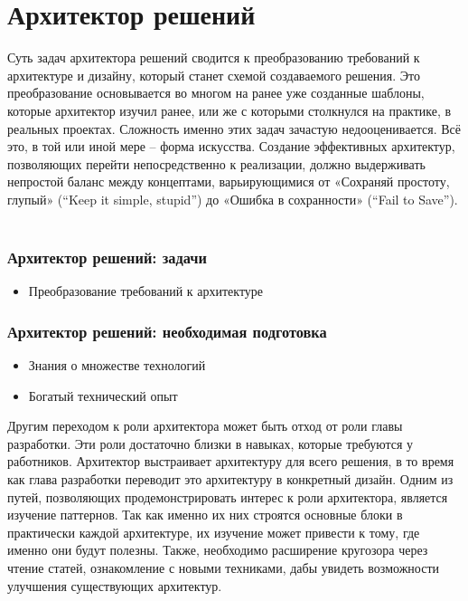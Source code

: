 \documentclass{../industrial-development}
\begin{document}
\section{Архитектор решений }

\lecturenotes

Суть задач архитектора решений сводится к преобразованию требований к архитектуре и дизайну, который станет схемой создаваемого решения. Это преобразование основывается во многом на ранее уже созданные шаблоны, которые архитектор изучил ранее, или же с которыми столкнулся на практике, в реальных проектах. 
Сложность именно этих задач зачастую недооценивается. Всё это, в той или иной мере – форма искусства. Создание эффективных архитектур, позволяющих перейти непосредственно к реализации, должно выдерживать непростой баланс между концептами, варьирующимися от «Сохраняй простоту, глупый» (“Keep it simple, stupid”) до «Ошибка в сохранности» (“Fail to Save”).
   ~\cite{Anatomy}

\begin{frame} \frametitle{Архитектор решений: задачи}
  \begin{itemize}
	\item Преобразование требований к архитектуре
	\end{itemize}
\end{frame}

\lecturenotes

\begin{frame} \frametitle{Архитектор решений: необходимая подготовка}
  \begin{itemize}
	\item Знания о множестве технологий
	\item Богатый технический опыт
	\end{itemize}
\end{frame}

\lecturenotes
Другим переходом к роли архитектора может быть отход от роли главы разработки. Эти роли достаточно близки в навыках, которые требуются у работников. Архитектор выстраивает архитектуру для всего решения, в то время как глава разработки переводит это архитектуру в конкретный дизайн. 
Одним из путей, позволяющих продемонстрировать интерес к роли архитектора, является изучение паттернов. Так как именно их них строятся основные блоки в практически каждой архитектуре, их изучение может привести к тому, где именно они будут полезны. Также, необходимо расширение кругозора через чтение статей, ознакомление с новыми техниками, дабы увидеть возможности улучшения существующих архитектур. 
 ~\cite{Anatomy}
\end{document}

